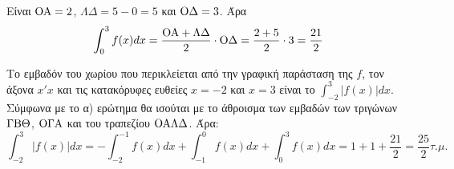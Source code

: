 \begin{alist}
\begin{rlist}
        Είναι ${\rm O}{\rm A} = 2$, $\Lambda\Delta = 5 - 0 = 5$ και ${\rm O}\Delta = 3$. Άρα
        \[
            \int_{0}^{3} f(x)dx = \frac{{\rm O}{\rm A} + \Lambda\Delta}{2} \cdot {\rm O}\Delta = \frac{2+5}{2} \cdot 3 = \frac{21}{2}
        \]
    \end{rlist}
    \item[β)] Το εμβαδόν του χωρίου που περικλείεται από την γραφική παράσταση της $f$, τον άξονα $x'x$ και τις κατακόρυφες ευθείες $x=-2$ και $x=3$ είναι το $\int_{-2}^{3} |f(x)|dx$. Σύμφωνα με το α) ερώτημα θα ισούται με το άθροισμα των εμβαδών των τριγώνων $\Gamma{\rm B}\Theta$, ${\rm O}\Gamma{\rm A}$ και του τραπεζίου ${\rm O}{\rm A}\Lambda\Delta$. Άρα:
    \[
        \int_{-2}^{3} |f(x)|dx = -\int_{-2}^{-1} f(x)dx + \int_{-1}^{0} f(x)dx + \int_{0}^{3} f(x)dx = 1+1+\frac{21}{2} = \frac{25}{2} \tau.\mu.
    \]
\end{alist}